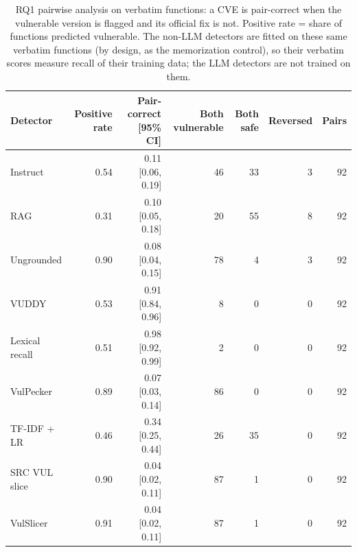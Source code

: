 \begin{table}[t]
\centering\small
\caption{RQ1 pairwise analysis on verbatim functions: a CVE is pair-correct when the vulnerable version is flagged and its official fix is not. Positive rate = share of functions predicted vulnerable. The non-LLM detectors are fitted on these same verbatim functions (by design, as the memorization control), so their verbatim scores measure recall of their training data; the LLM detectors are not trained on them.}
\label{tab:t3}
\begin{tabular}{lrrrrrr}
\toprule
Detector & Positive rate & Pair-correct [95\% CI] & Both vulnerable & Both safe & Reversed & Pairs \\
\midrule
Instruct & 0.54 & 0.11 [0.06, 0.19] & 46 & 33 & 3 & 92 \\
RAG & 0.31 & 0.10 [0.05, 0.18] & 20 & 55 & 8 & 92 \\
Ungrounded & 0.90 & 0.08 [0.04, 0.15] & 78 & 4 & 3 & 92 \\
VUDDY & 0.53 & 0.91 [0.84, 0.96] & 8 & 0 & 0 & 92 \\
Lexical recall & 0.51 & 0.98 [0.92, 0.99] & 2 & 0 & 0 & 92 \\
VulPecker & 0.89 & 0.07 [0.03, 0.14] & 86 & 0 & 0 & 92 \\
TF-IDF + LR & 0.46 & 0.34 [0.25, 0.44] & 26 & 35 & 0 & 92 \\
SRC VUL slice & 0.90 & 0.04 [0.02, 0.11] & 87 & 1 & 0 & 92 \\
VulSlicer & 0.91 & 0.04 [0.02, 0.11] & 87 & 1 & 0 & 92 \\
\bottomrule
\end{tabular}
\end{table}
